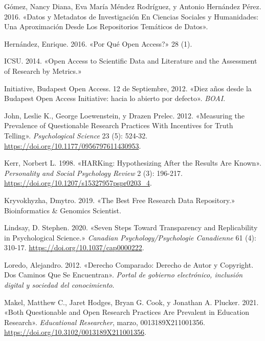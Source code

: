 \documentclass[
  spanish,
  letterpaper,
  DIV=11,
  numbers=noendperiod]{scrreprt}
\newlength{\cslhangindent}
\newenvironment{CSLReferences}[2] %
 {\begin{list}{}{%
  \setlength{\itemindent}{0pt}
  \setlength{\leftmargin}{0pt}
  \setlength{\parsep}{0pt}
  \ifodd #1
   \setlength{\leftmargin}{\cslhangindent}
   \setlength{\itemindent}{-1\cslhangindent}
  \fi
  \setlength{\itemsep}{#2\baselineskip}}}
 {\end{list}}
\begin{document}
\begin{CSLReferences}{1}{0}
Gómez, Nancy Diana, Eva María Méndez Rodríguez, y Antonio Hernández
Pérez. 2016. {«Datos y Metadatos de Investigaci{ó}n En Ciencias Sociales
y Humanidades: Una Aproximaci{ó}n Desde Los Repositorios Tem{á}ticos de
Datos»}.

Hernández, Enrique. 2016. {«{\textquestiondown}{Por} Qu{é} Open
Access?»} 28 (1).

ICSU. 2014. {«Open {Access} to {Scientific Data} and {Literature} and
the {Assessment} of {Research} by {Metrics}.»}

Initiative, Budapest Open Access. 12 de Septiembre, 2012. {«{Diez a{ñ}os
desde la Budapest Open Access Initiative: hacia lo abierto por
defecto}»}. \emph{BOAI}.

John, Leslie K., George Loewenstein, y Drazen Prelec. 2012. {«Measuring
the {Prevalence} of {Questionable Research Practices With Incentives}
for {Truth Telling}»}. \emph{Psychological Science} 23 (5): 524-32.
\url{https://doi.org/10.1177/0956797611430953}.

Kerr, Norbert L. 1998. {«{HARKing}: {Hypothesizing After} the {Results}
Are {Known}»}. \emph{Personality and Social Psychology Review} 2 (3):
196-217. \url{https://doi.org/10.1207/s15327957pspr0203_4}.

Kryvokhyzha, Dmytro. 2019. {«The {Best Free Research Data Repository}.»}
Bioinformatics \& Genomics Scientist.

Lindsay, D. Stephen. 2020. {«Seven Steps Toward Transparency and
Replicability in Psychological Science.»} \emph{Canadian
Psychology/Psychologie Canadienne} 61 (4): 310-17.
\url{https://doi.org/10.1037/cap0000222}.

Loredo, Alejandro. 2012. {«Derecho {Comparado}: {Derecho} de {Autor} y
{Copyright}. {Dos} Caminos Que Se Encuentran»}. \emph{Portal de gobierno
electr{ó}nico, inclusi{ó}n digital y sociedad del conocimiento}.

Makel, Matthew C., Jaret Hodges, Bryan G. Cook, y Jonathan A. Plucker.
2021. {«Both {Questionable} and {Open Research Practices Are Prevalent}
in {Education Research}»}. \emph{Educational Researcher}, marzo,
0013189X211001356. \url{https://doi.org/10.3102/0013189X211001356}.


\end{CSLReferences}
\end{document}
